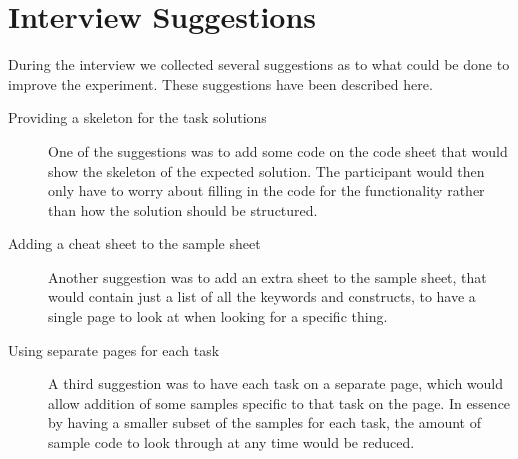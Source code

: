 \section{Interview Suggestions}
During the interview we collected several suggestions as to what could be done to improve the experiment.
These suggestions have been described here.

\begin{description}
\item[Providing a skeleton for the task solutions] One of the suggestions was to add some code on the code sheet that would show the skeleton of the expected solution. The participant would then only have to worry about filling in the code for the functionality rather than how the solution should be structured.
\item[Adding a cheat sheet to the sample sheet] Another suggestion was to add an extra sheet to the sample sheet, that would contain just a list of all the keywords and constructs, to have a single page to look at when looking for a specific thing.
\item[Using separate pages for each task] A third suggestion was to have each task on a separate page, which would allow addition of some samples specific to that task on the page. In essence by having a smaller subset of the samples for each task, the amount of sample code to look through at any time would be reduced.
\end{description}